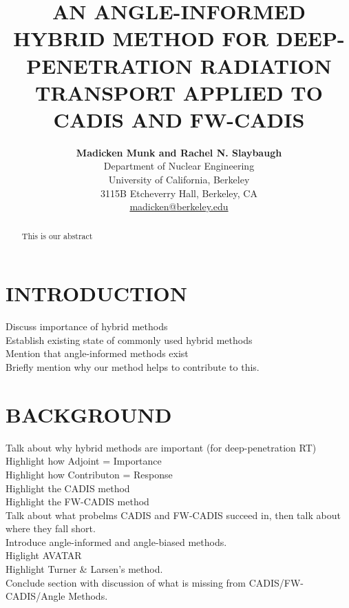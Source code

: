 \documentclass[12pt]{article}
\title{AN ANGLE-INFORMED HYBRID METHOD FOR DEEP-PENETRATION RADIATION TRANSPORT APPLIED TO CADIS AND FW-CADIS}
\author{ 
  \textbf{Madicken Munk and Rachel N. Slaybaugh} \\
  Department of Nuclear Engineering \\
  University of California, Berkeley \\
  3115B Etcheverry Hall, Berkeley, CA \\
  \href{mailto:madicken@berkeley.edu}{madicken@berkeley.edu}\\
  }
\begin{document}


\maketitle

\begin{abstract}
This is our abstract
\end{abstract}


%
\section{INTRODUCTION}
\label{sect::intro}

Discuss importance of hybrid methods \\
Establish existing state of commonly used hybrid methods \\
Mention that angle-informed methods exist \\
Briefly mention why our method helps to contribute to this. \\


%
\section{BACKGROUND}
\label{sect::second}

Talk about why hybrid methods are important (for deep-penetration RT) \\
Highlight how Adjoint = Importance \\
Highlight how Contributon = Response \\
Highlight the CADIS method \\
Highlight the FW-CADIS method \\
Talk about what probelms CADIS and FW-CADIS succeed in, then talk about where they fall short. \\
Introduce angle-informed and angle-biased methods. \\
Higlight AVATAR \\
Highlight Turner \& Larsen's method. \\
Conclude section with discussion of what is missing from CADIS/FW-CADIS/Angle Methods. \\
\end{document}
